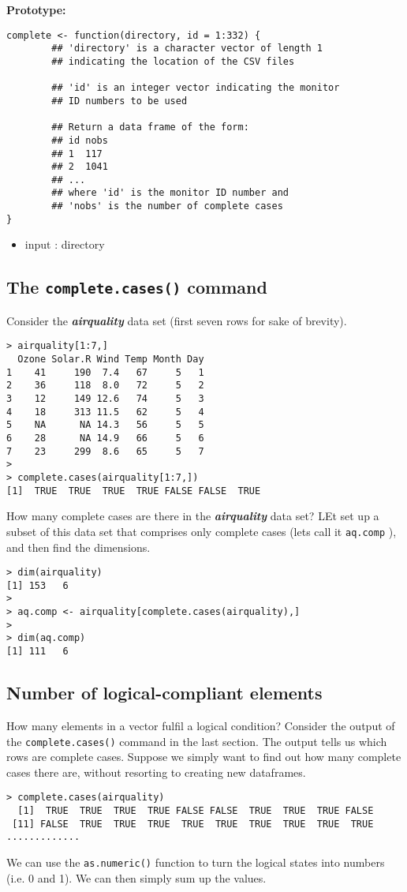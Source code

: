 \documentclass[]{article}
\begin{document}
\bigskip
\noindent \textbf{Prototype:}
\begin{framed}
\begin{verbatim}
complete <- function(directory, id = 1:332) {
        ## 'directory' is a character vector of length 1 
        ## indicating the location of the CSV files

        ## 'id' is an integer vector indicating the monitor 
        ## ID numbers to be used
        
        ## Return a data frame of the form:
        ## id nobs
        ## 1  117
        ## 2  1041
        ## ...
        ## where 'id' is the monitor ID number and 
        ## 'nobs' is the number of complete cases
}
\end{verbatim} 
\end{framed}
\begin{itemize}
\item input : directory
\end{itemize}
\newpage
\subsection{The \texttt{complete.cases()} command}
Consider the \textit{\textbf{airquality}} data set (first seven rows for sake of brevity).
\begin{verbatim}
> airquality[1:7,]
  Ozone Solar.R Wind Temp Month Day
1    41     190  7.4   67     5   1
2    36     118  8.0   72     5   2
3    12     149 12.6   74     5   3
4    18     313 11.5   62     5   4
5    NA      NA 14.3   56     5   5
6    28      NA 14.9   66     5   6
7    23     299  8.6   65     5   7
>
> complete.cases(airquality[1:7,])
[1]  TRUE  TRUE  TRUE  TRUE FALSE FALSE  TRUE
\end{verbatim}
How many complete cases are there in the \textit{\textbf{airquality}} data set? LEt set up a subset of this data set that comprises only complete cases (lets call it \texttt{aq.comp} ), and then find the dimensions.
\begin{verbatim}
> dim(airquality)
[1] 153   6
>
> aq.comp <- airquality[complete.cases(airquality),] 
>
> dim(aq.comp)
[1] 111   6
\end{verbatim}

\newpage
\subsection{Number of logical-compliant elements}
How many elements in a vector fulfil a logical condition? Consider the output of the \texttt{complete.cases()} command in the last section. The output tells us which rows are complete cases. Suppose we simply want to find out how many complete cases there are, without resorting to creating new dataframes.
\begin{verbatim}
> complete.cases(airquality)
  [1]  TRUE  TRUE  TRUE  TRUE FALSE FALSE  TRUE  TRUE  TRUE FALSE
 [11] FALSE  TRUE  TRUE  TRUE  TRUE  TRUE  TRUE  TRUE  TRUE  TRUE
.............

\end{verbatim}
We can use the \texttt{as.numeric()} function to turn the logical states into numbers (i.e. 0 and 1). We can then simply sum up the values.
\end{document}

